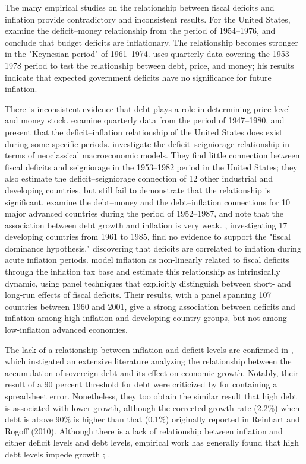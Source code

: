 \documentclass[12pt, titlepage]{article}
\numberwithin{equation}{section}
\begin{document}
The many empirical studies on the relationship between fiscal deficits and inflation provide contradictory and inconsistent results. For the United States, \cite{Hamburger1981} examine the deficit–money relationship from the period of 1954–1976, and conclude that budget deficits are inflationary. The relationship becomes stronger in the "Keynesian period" of 1961–1974. \cite{Dwyer82} uses quarterly data covering the 1953– 1978 period to test the
relationship between debt, price, and money; his results indicate that expected government
deficits have no significance for future inflation.

There is inconsistent evidence that debt plays a role in determining price level and money stock. \cite{Ahking85}  examine quarterly data from the period of 1947–1980, and present that the deficit–inflation relationship of the United States does exist during some specific periods. \cite{King1985} investigate the deficit–seigniorage relationship in terms of neoclassical macroeconomic models. They find little connection between fiscal deficits and seigniorage in the 1953–1982 period in the United States; they also estimate the deficit–seigniorage connection of 12 other industrial and developing countries, but still fail to demonstrate that the relationship is significant. \cite{Protopapadakis87} examine the debt–money and the debt–inflation connections for 10 major advanced countries during the period of 1952–1987, and note that the association between debt growth and inflation is very weak. \cite{Haan1990}, investigating 17 developing countries from 1961 to 1985, find no evidence to support the "fiscal dominance hypothesis," discovering that deficits are correlated to inflation during acute inflation periods.
\cite{Catao2005} model inflation as non-linearly related to fiscal deficits through the inflation tax base and estimate this relationship as intrinsically dynamic, using panel techniques that explicitly distinguish between short- and long-run effects of fiscal deficits. Their results, with a panel spanning 107 countries between 1960 and 2001, give a strong association between deficits and inflation among high-inflation and developing country groups, but not among low-inflation advanced economies.

The lack of a relationship between inflation and deficit levels are confirmed in \cite{Reinhart2010}, which instigated an extensive literature analyzing the relationship between the accumulation of sovereign debt and its effect on economic growth. Notably, their result of a 90 percent threshold for debt were criticized by \cite{Herndon2014} for containing a spreadsheet error. Nonetheless, they too obtain the similar result that high debt
is associated with lower growth, although the corrected growth rate (2.2\%) when debt is
above 90\% is higher than that (0.1\%) originally reported in Reinhart and Rogoff (2010).
Although there is a lack of relationship between inflation and either deficit levels and debt
levels, empirical work has generally found that high debt levels impede growth \citep{Cecchetti2015}; \citep{Woo2015}.
\end{document}
